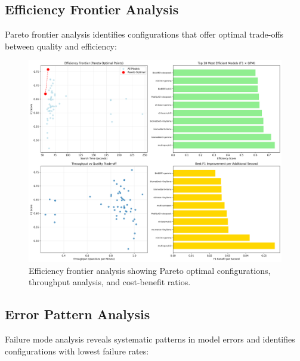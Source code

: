 \subsection{Efficiency Frontier Analysis}


Pareto frontier analysis identifies configurations that offer optimal trade-offs between quality and efficiency:

\begin{figure}[!htbp]
  \centering
  \includegraphics[width=\textwidth]{chap4_results/images/efficiency_frontier_analysis.png}
  \caption{Efficiency frontier analysis showing Pareto optimal configurations, throughput analysis, and cost-benefit ratios.}
  \label{fig:efficiency_frontier}
\end{figure}

\subsection{Error Pattern Analysis}


Failure mode analysis reveals systematic patterns in model errors and identifies configurations with lowest failure rates:

